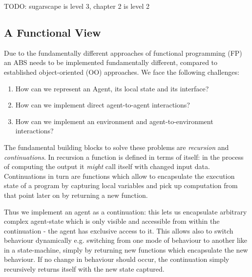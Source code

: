 TODO: \cite{macal_everything_2016} sugarscape is level 3, chapter 2 is level 2

\subsection{A Functional View}
Due to the fundamentally different approaches of functional programming (FP) an ABS needs to be implemented fundamentally different, compared to established object-oriented (OO) approaches. We face the following challenges:

\begin{enumerate}
	\item How can we represent an Agent, its local state and its interface?
	\item How can we implement direct agent-to-agent interactions?
	\item How can we implement an environment and agent-to-environment interactions? 
\end{enumerate}

The fundamental building blocks to solve these problems are \textit{recursion} and \textit{continuations}. In recursion a function is defined in terms of itself: in the process of computing the output it \textit{might} call itself with changed input data. Continuations in turn are functions which allow to encapsulate the execution state of a program by capturing local variables and pick up computation from that point later on by returning a new function.

Thus we implement an agent as a continuation: this lets us encapsulate arbitrary complex agent-state which is only visible and accessible from within the continuation - the agent has exclusive access to it. This allows also to switch behaviour dynamically e.g. switching from one mode of behaviour to another like in a state-machine, simply by returning new functions which encapsulate the new behaviour. If no change in behaviour should occur, the continuation simply recursively returns itself with the new state captured.

